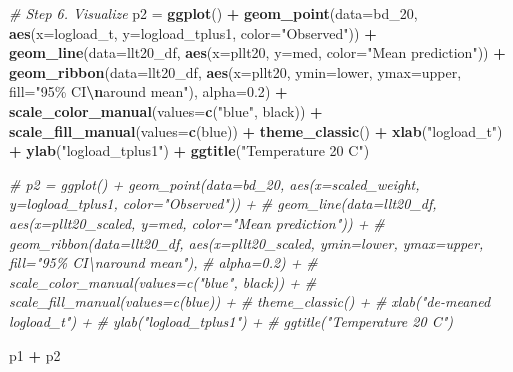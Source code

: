 \documentclass[
]{article}
\newenvironment{Shaded}{\begin{snugshade}}{\end{snugshade}}
\newcommand{\AttributeTok}[1]{\textcolor[rgb]{0.13,0.29,0.53}{#1}}
\newcommand{\CommentTok}[1]{\textcolor[rgb]{0.56,0.35,0.01}{\textit{#1}}}
\newcommand{\FloatTok}[1]{\textcolor[rgb]{0.00,0.00,0.81}{#1}}
\newcommand{\FunctionTok}[1]{\textcolor[rgb]{0.13,0.29,0.53}{\textbf{#1}}}
\newcommand{\NormalTok}[1]{#1}
\newcommand{\OtherTok}[1]{\textcolor[rgb]{0.56,0.35,0.01}{#1}}
\newcommand{\SpecialCharTok}[1]{\textcolor[rgb]{0.81,0.36,0.00}{\textbf{#1}}}
\newcommand{\StringTok}[1]{\textcolor[rgb]{0.31,0.60,0.02}{#1}}
\begin{document}
\begin{Shaded}
\begin{Highlighting}[]
\CommentTok{\# Step 6. Visualize}
\NormalTok{p2 }\OtherTok{=} \FunctionTok{ggplot}\NormalTok{() }\SpecialCharTok{+} \FunctionTok{geom\_point}\NormalTok{(}\AttributeTok{data=}\NormalTok{bd\_20, }\FunctionTok{aes}\NormalTok{(}\AttributeTok{x=}\NormalTok{logload\_t, }\AttributeTok{y=}\NormalTok{logload\_tplus1, }\AttributeTok{color=}\StringTok{"Observed"}\NormalTok{)) }\SpecialCharTok{+}
           \FunctionTok{geom\_line}\NormalTok{(}\AttributeTok{data=}\NormalTok{llt20\_df, }\FunctionTok{aes}\NormalTok{(}\AttributeTok{x=}\NormalTok{pllt20, }\AttributeTok{y=}\NormalTok{med, }\AttributeTok{color=}\StringTok{"Mean prediction"}\NormalTok{)) }\SpecialCharTok{+}
           \FunctionTok{geom\_ribbon}\NormalTok{(}\AttributeTok{data=}\NormalTok{llt20\_df, }\FunctionTok{aes}\NormalTok{(}\AttributeTok{x=}\NormalTok{pllt20, }\AttributeTok{ymin=}\NormalTok{lower, }\AttributeTok{ymax=}\NormalTok{upper, }\AttributeTok{fill=}\StringTok{"95\% CI}\SpecialCharTok{\textbackslash{}n}\StringTok{around mean"}\NormalTok{),}
                                         \AttributeTok{alpha=}\FloatTok{0.2}\NormalTok{) }\SpecialCharTok{+}
           \FunctionTok{scale\_color\_manual}\NormalTok{(}\AttributeTok{values=}\FunctionTok{c}\NormalTok{(}\StringTok{"blue"}\NormalTok{, }\StringTok{\textquotesingle{}black\textquotesingle{}}\NormalTok{)) }\SpecialCharTok{+}
           \FunctionTok{scale\_fill\_manual}\NormalTok{(}\AttributeTok{values=}\FunctionTok{c}\NormalTok{(}\StringTok{\textquotesingle{}blue\textquotesingle{}}\NormalTok{)) }\SpecialCharTok{+}
           \FunctionTok{theme\_classic}\NormalTok{() }\SpecialCharTok{+}
           \FunctionTok{xlab}\NormalTok{(}\StringTok{"logload\_t"}\NormalTok{) }\SpecialCharTok{+}
       \FunctionTok{ylab}\NormalTok{(}\StringTok{"logload\_tplus1"}\NormalTok{) }\SpecialCharTok{+}
       \FunctionTok{ggtitle}\NormalTok{(}\StringTok{"Temperature 20 C"}\NormalTok{)}

\CommentTok{\# p2 = ggplot() + geom\_point(data=bd\_20, aes(x=scaled\_weight, y=logload\_tplus1, color="Observed")) +}
\CommentTok{\#          geom\_line(data=llt20\_df, aes(x=pllt20\_scaled, y=med, color="Mean prediction")) + }
\CommentTok{\#          geom\_ribbon(data=llt20\_df, aes(x=pllt20\_scaled, ymin=lower, ymax=upper, fill="95\% CI\textbackslash{}naround mean"), }
\CommentTok{\#                                        alpha=0.2) +}
\CommentTok{\#          scale\_color\_manual(values=c("blue", \textquotesingle{}black\textquotesingle{})) +}
\CommentTok{\#          scale\_fill\_manual(values=c(\textquotesingle{}blue\textquotesingle{})) +}
\CommentTok{\#          theme\_classic() +}
\CommentTok{\#          xlab("de{-}meaned logload\_t") + }
\CommentTok{\#        ylab("logload\_tplus1") +}
\CommentTok{\#        ggtitle("Temperature 20 C")}

\NormalTok{p1 }\SpecialCharTok{+}\NormalTok{ p2}
\end{Highlighting}
\end{Shaded}
\end{document}
